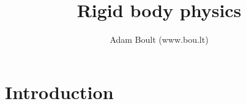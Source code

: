 \documentclass[oneside]{book}
\begin{document}
\author{Adam Boult (www.bou.lt)}
\title{Rigid body physics}
\maketitle

\setcounter{tocdepth}{0}
\tableofcontents



\part{Introduction}

\end{document}
